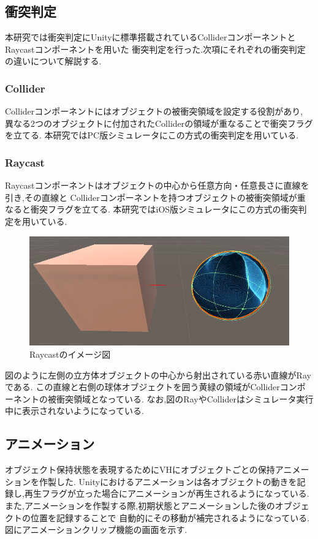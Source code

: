 \documentclass{ltjsreport}
\begin{document}
		\subsection{衝突判定}
			本研究では衝突判定にUnityに標準搭載されているColliderコンポーネントとRaycastコンポーネントを用いた
			衝突判定を行った.次項にそれぞれの衝突判定の違いについて解説する.

			\subsubsection{Collider}
				Colliderコンポーネントにはオブジェクトの被衝突領域を設定する役割があり,
				異なる2つのオブジェクトに付加されたColliderの領域が重なることで衝突フラグを立てる.
				本研究ではPC版シミュレータにこの方式の衝突判定を用いている.

			\subsubsection{Raycast}
				Raycastコンポーネントはオブジェクトの中心から任意方向・任意長さに直線を引き,その直線と
				Colliderコンポーネントを持つオブジェクトの被衝突領域が重なると衝突フラグを立てる.
				本研究ではiOS版シミュレータにこの方式の衝突判定を用いている.
			\begin{figure}[H]
			\centering
			\includegraphics[width = 12cm]{../figs/raycast.png}
			\caption{Raycastのイメージ図}
			\label{fig:Raycast}
			\end{figure}
\vspace{-15pt}
			図のように左側の立方体オブジェクトの中心から射出されている赤い直線がRayである.
			この直線と右側の球体オブジェクトを囲う黄緑の領域がColliderコンポーネントの被衝突領域となっている.
			なお,図のRayやColliderはシミュレータ実行中に表示されないようになっている.

		\subsection{アニメーション}
			オブジェクト保持状態を表現するためにVHにオブジェクトごとの保持アニメーションを作製した.
			Unityにおけるアニメーションは各オブジェクトの動きを記録し,再生フラグが立った場合にアニメーションが再生されるようになっている.
			また,アニメーションを作製する際,初期状態とアニメーションした後のオブジェクトの位置を記録することで
			自動的にその移動が補完されるようになっている.図にアニメーションクリップ機能の画面を示す.
\end{document}
